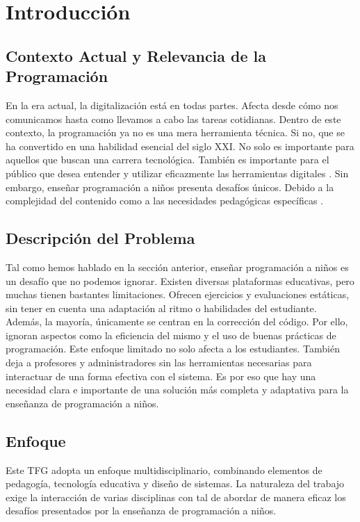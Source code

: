 \chapter{Introducción} \label{chap:introduction}

\section{Contexto Actual y Relevancia de la Programación}
En la era actual, la digitalización está en todas partes. Afecta desde cómo nos comunicamos hasta como llevamos a cabo las tareas cotidianas. Dentro de este contexto,  la programación ya no es una mera herramienta técnica. Si no, que se ha convertido en una habilidad esencial del siglo XXI. No solo es importante para aquellos que buscan una carrera tecnológica. También es importante para el público que desea entender y utilizar eficazmente las herramientas digitales \cite{hadi_partovi}. Sin embargo, enseñar programación a niños presenta desafíos únicos. Debido a la complejidad del contenido como a las necesidades pedagógicas específicas \cite{liukas_tedxcern}.

\section{Descripción del Problema}

Tal como hemos hablado en la sección anterior, enseñar programación a niños es un desafío que no podemos ignorar. Existen diversas plataformas educativas, pero muchas tienen bastantes limitaciones. Ofrecen ejercicios y evaluaciones estáticas, sin tener en cuenta una adaptación al ritmo o habilidades del estudiante. Además, la mayoría, únicamente se centran en la corrección del código. Por ello, ignoran aspectos como la eficiencia del mismo y el uso de buenas prácticas de programación. Este enfoque limitado no solo afecta a los estudiantes. También deja a profesores y administradores sin las herramientas necesarias para interactuar de una forma efectiva con el sistema. Es por eso que hay una necesidad clara e importante de una solución más completa y adaptativa para la enseñanza de programación a niños.

\section{Enfoque}
Este TFG adopta un enfoque multidisciplinario, combinando elementos de pedagogía, tecnología educativa y diseño de sistemas. La naturaleza del trabajo exige la interacción de varias disciplinas con tal de abordar de manera eficaz los desafíos presentados por la enseñanza de programación a niños.

